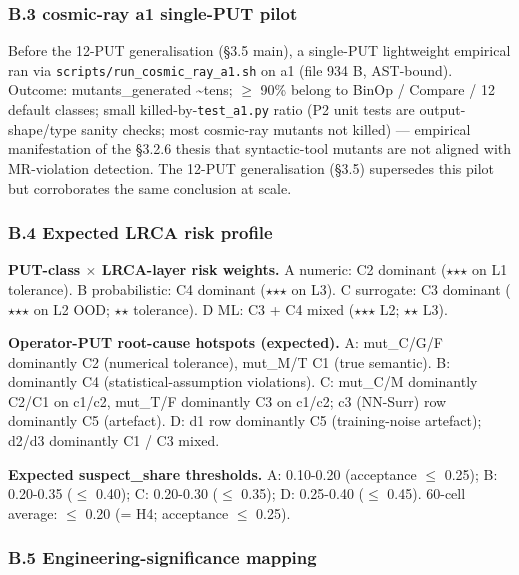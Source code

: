 \documentclass[review,12pt,authoryear]{elsarticle}
\begin{document}
\subsubsection{B.3 cosmic-ray a1 single-PUT pilot}\label{b.3-cosmic-ray-a1-single-put-pilot-pre-12-put-empirical}

Before the 12-PUT generalisation (§3.5 main), a single-PUT lightweight
empirical ran via \texttt{scripts/run\_cosmic\_ray\_a1.sh} on a1 (file
934 B, AST-bound). Outcome: mutants\_generated \textasciitilde tens; $\geq$
90\% belong to BinOp / Compare / 12 default classes; small
killed-by-\texttt{test\_a1.py} ratio (P2 unit tests are
output-shape/type sanity checks; most cosmic-ray mutants not killed) ---
empirical manifestation of the §3.2.6 thesis that syntactic-tool mutants
are not aligned with MR-violation detection. The 12-PUT generalisation
(§3.5) supersedes this pilot but corroborates the same conclusion at
scale.

\subsubsection{B.4 Expected LRCA risk profile}\label{b.4-expected-lrca-risk-profile}

\textbf{PUT-class $\times$ LRCA-layer risk weights.} A numeric: C2 dominant
($\star$$\star$$\star$ on L1 tolerance). B probabilistic: C4 dominant ($\star$$\star$$\star$ on L3). C
surrogate: C3 dominant ($\star$$\star$$\star$ on L2 OOD; $\star$$\star$ tolerance). D ML: C3 + C4
mixed ($\star$$\star$$\star$ L2; $\star$$\star$ L3).

\textbf{Operator-PUT root-cause hotspots (expected).} A: mut\_C/G/F
dominantly C2 (numerical tolerance), mut\_M/T C1 (true semantic). B:
dominantly C4 (statistical-assumption violations). C: mut\_C/M
dominantly C2/C1 on c1/c2, mut\_T/F dominantly C3 on c1/c2; c3 (NN-Surr)
row dominantly C5 (artefact). D: d1 row dominantly C5 (training-noise
artefact); d2/d3 dominantly C1 / C3 mixed.

\textbf{Expected suspect\_share thresholds.} A: 0.10-0.20 (acceptance $\leq$
0.25); B: 0.20-0.35 ($\leq$ 0.40); C: 0.20-0.30 ($\leq$ 0.35); D: 0.25-0.40 ($\leq$
0.45). 60-cell average: $\leq$ 0.20 (= H4; acceptance $\leq$ 0.25).

\subsubsection{B.5 Engineering-significance mapping}\label{b.5-engineering-significance-mapping}
\end{document}
